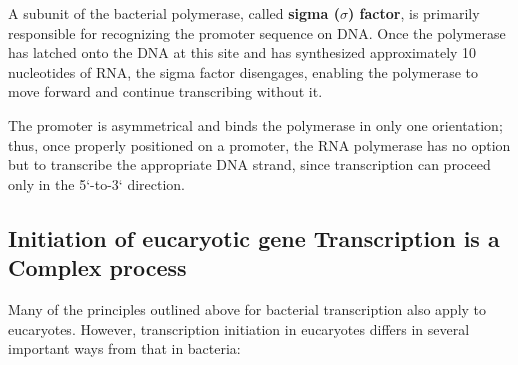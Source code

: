 A subunit of the bacterial polymerase, called \textbf{sigma ($\sigma$) factor}, is primarily
responsible for recognizing the promoter sequence on DNA. Once the
polymerase has latched onto the DNA at this site and has synthesized
approximately 10 nucleotides of RNA, the sigma factor disengages, enabling
the polymerase to move forward and continue transcribing without it.

The promoter is asymmetrical and binds the polymerase in only one orientation; thus, once properly
positioned on a promoter, the RNA polymerase has no option but to transcribe
the appropriate DNA strand, since transcription can proceed only
in the 5`-to-3` direction.

\subsection{Initiation of eucaryotic gene Transcription is a Complex process}

Many of the principles outlined above for bacterial transcription also
apply to eucaryotes. However, transcription initiation in eucaryotes differs
in several important ways from that in bacteria:


